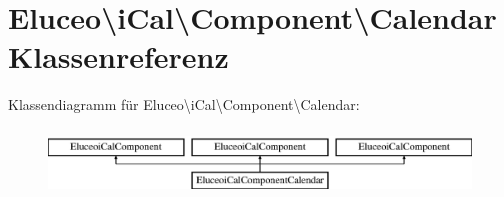 \hypertarget{class_eluceo_1_1i_cal_1_1_component_1_1_calendar}{}\section{Eluceo\textbackslash{}i\+Cal\textbackslash{}Component\textbackslash{}Calendar Klassenreferenz}
\label{class_eluceo_1_1i_cal_1_1_component_1_1_calendar}
Klassendiagramm für Eluceo\textbackslash{}i\+Cal\textbackslash{}Component\textbackslash{}Calendar\+:\begin{figure}[H]
\begin{center}
\leavevmode
\includegraphics[height=1.794872cm]{class_eluceo_1_1i_cal_1_1_component_1_1_calendar}
\end{center}
\end{figure}

